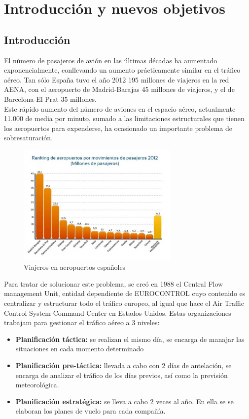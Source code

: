 \chapter{Introducción y nuevos objetivos}

\section{Introducción}
El número de pasajeros de avión en las últimas décadas ha aumentado exponencialmente, conllevando un aumento prácticamente similar en el tráfico aéreo. Tan sólo España tuvo el año 2012 195 millones de viajeros en la red AENA, con el aeropuerto de Madrid-Barajas 45 millones de viajeros, y el de Barcelona-El Prat 35 millones. \\
Este rápido aumento del número de aviones en el espacio aéreo, actualmente 11.000 de media por minuto, sumado a las limitaciones estructurales que tienen los aeropuertos para expenderse, ha ocasionado un importante problema de sobresaturación.
\begin{figure}[H]
	\begin{center}
		\centering
		\includegraphics[width=0.7\textwidth]{./imagenes/introduccion/Ranking_de_aeropuertos_espayoles_por_pasajeros_horiz.jpg}
		\caption{Viajeros en aeropuertos españoles}
		\label{fig: Viajeros en aeropuertos españoles}
	\end{center}
\end{figure}	

Para tratar de solucionar este problema, se creó en 1988 el Central Flow management Unit, entidad dependiente de EUROCONTROL cuyo contenido es centralizar y estructurar todo el tráfico europeo, al igual que hace el Air Traffic Control System Command Center en Estados Unidos. Estas organizaciones trabajam para gestionar el tráfico aéreo a 3 niveles:
\begin{itemize}
	\item \textbf{Planificación táctica:} se realizan el mismo día, se encarga de manajar las situaciones en cada momento determinado
	\item \textbf{Planificación pre-táctica:} llevada a cabo con 2 días de antelación, se encarga de analizar el tráfico de los días previos, así como la previsión meteorológica.
	\item \textbf{Planificación estratégica: }se lleva a cabo 2 veces al año. En ella se se elaboran los planes de vuelo para cada compañía.
\end{itemize}


